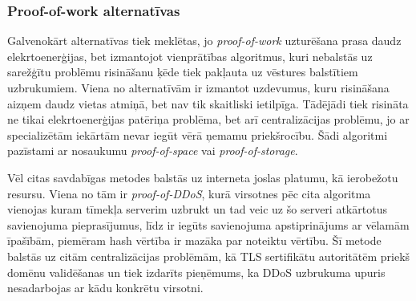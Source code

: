 \subsubsection{Proof-of-work alternatīvas}
Galvenokārt alternatīvas tiek meklētas, jo \textit{proof-of-work} uzturēšana prasa daudz elekrtoenerģijas, bet izmantojot vienprātības algoritmus, kuri nebalstās uz sarežģītu problēmu risināšanu ķēde tiek pakļauta uz vēstures balstītiem uzbrukumiem. Viena no alternatīvām ir izmantot uzdevumus, kuru risināšana aizņem daudz vietas atmiņā, bet nav tik skaitliski ietilpīga.\cite{dziembowski15} Tādējādi tiek risināta ne tikai elekrtoenerģijas patēriņa problēma, bet arī centralizācijas problēmu, jo ar specializētām iekārtām nevar iegūt vērā ņemamu priekšrocību. Šādi algoritmi pazīstami ar nosaukumu \textit{proof-of-space} vai \textit{proof-of-storage}.

Vēl citas savdabīgas metodes balstās uz interneta joslas platumu, kā ierobežotu resursu. Viena no tām ir \textit{proof-of-DDoS}, kurā virsotnes pēc cita algoritma vienojas kuram tīmekļa serverim uzbrukt un tad veic uz šo serveri atkārtotus savienojuma pieprasījumus, līdz ir iegūts savienojuma apstiprinājums ar vēlamām īpašībām, piemēram hash vērtība ir mazāka par noteiktu vērtību. Šī metode balstās uz citām centralizācijas problēmām, kā TLS sertifikātu autoritātēm priekš domēnu validēšanas un tiek izdarīts pieņēmums, ka DDoS uzbrukuma upuris nesadarbojas ar kādu konkrētu virsotni.\cite{wustrow16}

